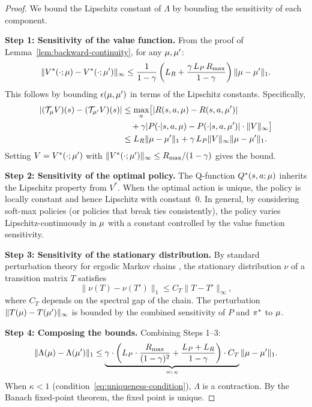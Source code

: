 \documentclass[11pt,a4paper]{article}
\begin{document}
\begin{proof}
We bound the Lipschitz constant of $\Lambda$ by bounding the
sensitivity of each component.

\textbf{Step 1: Sensitivity of the value function.}
From the proof of Lemma~\ref{lem:backward-continuity}, for any
$\mu, \mu'$:
\[
  \|V^*(\cdot; \mu) - V^*(\cdot; \mu')\|_\infty
  \leq \frac{1}{1-\gamma}\left(
    L_R + \frac{\gamma \, L_P \, R_{\max}}{1-\gamma}
  \right) \|\mu - \mu'\|_1.
\]
This follows by bounding $\epsilon(\mu, \mu')$ in
terms of the Lipschitz constants.  Specifically,
\begin{align*}
  |(\mathcal{T}_\mu V)(s) - (\mathcal{T}_{\mu'} V)(s)|
  &\leq \max_a \bigl[|R(s,a,\mu) - R(s,a,\mu')| \\
  &\quad + \gamma |P(\cdot|s,a,\mu) - P(\cdot|s,a,
    \mu')| \cdot \|V\|_\infty \bigr] \\
  &\leq L_R \|\mu-\mu'\|_1
    + \gamma\, L_P \|V\|_\infty \|\mu-\mu'\|_1.
\end{align*}
Setting $V = V^*(\cdot; \mu')$ with $\|V^*(\cdot;
\mu')\|_\infty \leq R_{\max}/(1-\gamma)$ gives the bound.

\textbf{Step 2: Sensitivity of the optimal policy.}
The Q-function $Q^*(s,a;\mu)$ inherits the Lipschitz
property from $V^*$.  When the optimal action is unique, the
policy is locally constant and hence Lipschitz with constant~$0$.
In general, by considering soft-max policies (or policies that
break ties consistently), the policy varies Lipschitz-continuously
in $\mu$ with a constant controlled by the value function
sensitivity.

\textbf{Step 3: Sensitivity of the stationary distribution.}
By standard perturbation theory for ergodic Markov chains
\citep[Chapter~3]{bensoussan2013}, the stationary distribution
$\nu$ of a transition matrix $T$ satisfies
\[
  \|\nu(T) - \nu(T')\|_1 \leq C_T \|T - T'\|_\infty,
\]
where $C_T$ depends on the spectral gap of the chain.  The
perturbation $\|T(\mu) - T(\mu')\|_\infty$ is
bounded by the combined sensitivity of $P$ and $\pi^*$ to
$\mu$.

\textbf{Step 4: Composing the bounds.}
Combining Steps 1--3:
\[
  \|\Lambda(\mu) - \Lambda(\mu')\|_1
  \leq \underbrace{\gamma \cdot \left(
    L_P \cdot \frac{R_{\max}}{(1-\gamma)^2}
    + \frac{L_P + L_R}{1-\gamma}
  \right) \cdot C_T}_{=:\, \kappa}
  \|\mu - \mu'\|_1.
\]
When $\kappa < 1$ (condition~\eqref{eq:uniqueness-condition}),
$\Lambda$ is a contraction.  By the Banach fixed-point theorem,
the fixed point is unique.
\end{proof}
\end{document}
